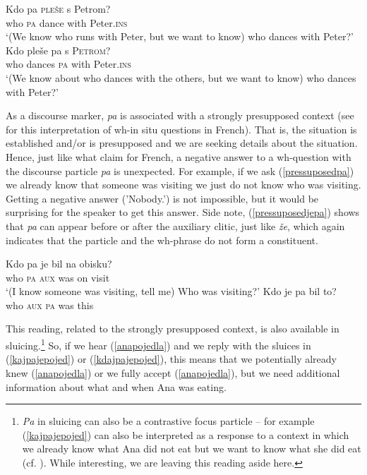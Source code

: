 \documentclass[output=paper,
modfonts,
newtxmath,
hidelinks
]{langscibook}
\begin{document}
\begin{exe}
\ex  \label{topicfocuspa}
\begin{xlist}
\ex \gll	Kdo pa \textsc{pleše} s Petrom?\\
		who \textsc{pa} dance with Peter.\textsc{ins}\\
\trans `(We know who runs with Peter, but we want to know) who dances with Peter?'
\ex \gll	Kdo pleše pa s \textsc{Petrom}?\\
		who dances \textsc{pa} with Peter.\textsc{ins}\\
\trans `(We know about who dances with the others, but we want to know) who dances with Peter?'
\end{xlist}
\end{exe}

\noindent As a discourse marker, \textit{pa} is associated with a strongly presupposed context (see \citealt{chengrooryck2000} for this interpretation of wh-in situ questions in French). That is, the situation is established and/or is presupposed and we are seeking details about the situation. Hence, just like what \cite{chengrooryck2000} claim for French, a negative answer to a wh-question with the discourse particle \textit{pa} is unexpected. For example, if we ask (\ref{pressuposedpa}) we already know that someone was visiting we just do not know who was visiting. Getting a negative answer ('Nobody.') is not impossible, but it would be surprising for the speaker to get this answer. Side note, (\ref{pressuposedjepa}) shows that \textit{pa} can appear before or after the auxiliary clitic, just like \textit{že}, which again indicates that the particle and the wh-phrase do not form a constituent. 

\begin{exe}
\ex \begin{xlist}
\ex \label{pressuposedpa}
\gll Kdo pa je bil na obisku?\\
	who \textsc{pa} \textsc{aux} was on visit\\
\trans `(I know someone was visiting, tell me) Who was visiting?'
\ex \label{pressuposedjepa} 
\gll Kdo je pa bil to?\\
who  \textsc{aux}  \textsc{pa} was this\\
\end{xlist}
\end{exe}

\noindent This reading, related to the strongly presupposed context, is also available in sluicing.\footnote{\textit{Pa} in sluicing can also be a contrastive focus particle -- for example (\ref{kajpajepojed}) can also be interpreted as a response to a context in which we already know what Ana did not eat but we want to know what she did eat (cf. \citealt{marusicetal2015}). While interesting, we are leaving this reading aside here.} So, if we hear (\ref{anapojedla}) and we reply with the sluices in (\ref{kajpajepojed}) or (\ref{kdajpajepojed}), this means that we potentially already knew (\ref{anapojedla}) or we fully accept (\ref{anapojedla}), but we need additional information about what and when Ana was eating. 
\end{document}
